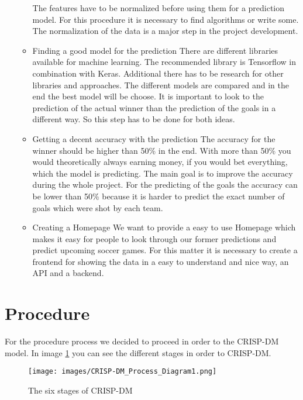 \begin{itemize}
\begin{itemize}
			The features have to be normalized before using them for a prediction model. For this procedure it is necessary to find algorithms or write some. The normalization of the data is a major step in the project development.
			\item Finding a good model for the prediction\newline 
			There are different libraries available for machine learning. The recommended library is Tensorflow in combination with Keras. Additional there has to be research for other libraries and approaches. The different models are compared and in the end the best model will be choose. It is important to look to the prediction of the actual winner than the prediction of the goals in a different way. So this step has to be done for both ideas.
			\item Getting a decent accuracy with the prediction \newline
			The accuracy for the winner should be higher than 50\% in the end. With more than 50\% you would theoretically always earning money, if you would bet everything, which the model is predicting. The main goal is to improve the accuracy during the whole project. For the predicting of the goals the accuracy can be lower than 50\% because it is harder to predict the exact number of goals which were shot by each team.
			\item Creating a Homepage\newline
			We want to provide a easy to use Homepage which makes it easy for people to look through our former predictions and predict upcoming soccer games. For this matter it is necessary to create a frontend for showing the data in a easy to understand and nice way, an API and a backend. 
		\end{itemize}
\end{itemize}
\section{Procedure}

For the procedure process we decided to proceed in order to the CRISP-DM model. In image \ref{CRISImage} you can see the different stages in order to CRISP-DM.

\begin{figure}[h]
\centering
\texttt{[image: images/CRISP-DM\_Process\_Diagram1.png]}
\caption{The six stages of CRISP-DM \cite{CRISPDig:2012}}
\label{CRISImage}
\end{figure}

